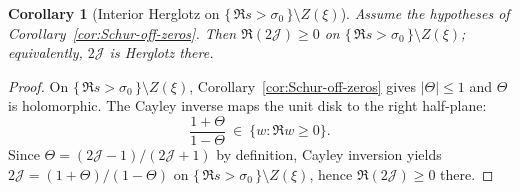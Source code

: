 \documentclass[11pt]{article}
\newtheorem{corollary}[theorem]{Corollary}
\theoremstyle{definition}
\theoremstyle{remark}
\theoremstyle{definition}
\begin{document}
\begin{corollary}[Interior Herglotz on \(\{\,\Re s>\sigma_0\,\}\setminus Z(\xi)\)]\label{cor:poisson-herglotz}
Assume the hypotheses of Corollary~\ref{cor:Schur-off-zeros}. Then $\Re(2\mathcal J)\ge 0$ on $\{\,\Re s>\sigma_0\,\}\setminus Z(\xi)$; equivalently, $2\mathcal J$ is Herglotz there.
\end{corollary}
\begin{proof}
On $\{\,\Re s>\sigma_0\,\}\setminus Z(\xi)$, Corollary~\ref{cor:Schur-off-zeros} gives $|\Theta|\le 1$ and $\Theta$ is holomorphic.
The Cayley inverse maps the unit disk to the right half-plane:
\[
  \frac{1+\Theta}{1-\Theta}\ \in\ \{w:\Re w\ge 0\}.
\]
Since $\Theta=(2\mathcal J-1)/(2\mathcal J+1)$ by definition, Cayley inversion yields
$2\mathcal J=(1+\Theta)/(1-\Theta)$ on $\{\,\Re s>\sigma_0\,\}\setminus Z(\xi)$, hence $\Re(2\mathcal J)\ge 0$ there.
\end{proof}
\end{document}
